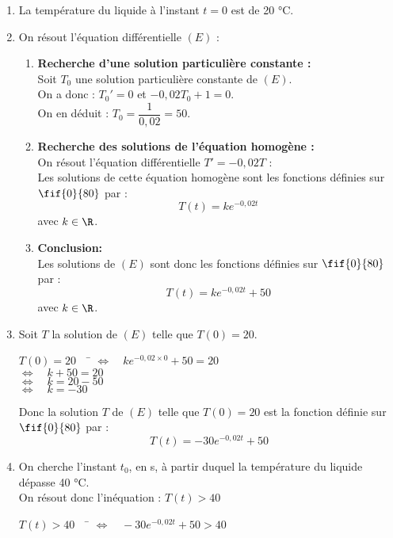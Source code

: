 \documentclass[a4paper,11pt,exos]{nsi}
\begin{document}
\textcolor{UGLiBlue}{
    \begin{enumerate}
        \item La température du liquide à l'instant $t=0$ est de 20 °C.
        \item On résout l'équation différentielle $(E)$ :
        \begin{enumerate}[label=\textbullet]
            \item \textbf{Recherche d’une solution particulière constante :}\\
            Soit $T_0$ une solution particulière constante de $(E)$.\\
            On a donc : $T_0' = 0$ et $-0{,}02T_0 + 1 = 0$.\\
            On en déduit : $T_0 = \dfrac{1}{0{,}02} = 50$.
            \item \textbf{Recherche des solutions de l'équation homogène :}\\
            On résout l'équation différentielle $T'=-0{,}02T$ :\\
            Les solutions de cette équation homogène sont les fonctions définies sur $\fif{0}{80}$ par :
            $$T(t) = ke^{-0{,}02t}$$
            avec $k \in \R$.
            \item \textbf{Conclusion:}\\
            Les solutions de $(E)$ sont donc les fonctions définies sur $\fif{0}{80}$ par :
            $$T(t) = ke^{-0{,}02t} + 50$$
            avec $k \in \R$.
        \end{enumerate}
        \item Soit $T$ la solution de $(E)$ telle que $T(0)=20$.
        \begin{tabbing}
            $T(0)=20 \quad$ \= $\iff\quad ke^{-0{,}02\times 0} + 50 = 20$\\
            \> $\iff\quad k + 50 = 20$\\
            \> $\iff\quad k = 20 - 50$\\
            \> $\iff\quad k = -30$
        \end{tabbing}
        Donc la solution $T$ de $(E)$ telle que $T(0)=20$ est la fonction définie sur $\fif{0}{80}$ par :
        $$T(t) = -30e^{-0{,}02t} + 50$$
        \item On cherche l'instant $t_0$, en s, à partir duquel la température du liquide dépasse 40 °C.\\
        On résout donc l'inéquation : $T(t) > 40$
        \begin{tabbing}
            $T(t) > 40 \quad$ \= $\iff\quad -30e^{-0{,}02t} + 50 > 40$\\

\end{tabbing}
\end{enumerate}}
\end{document}
